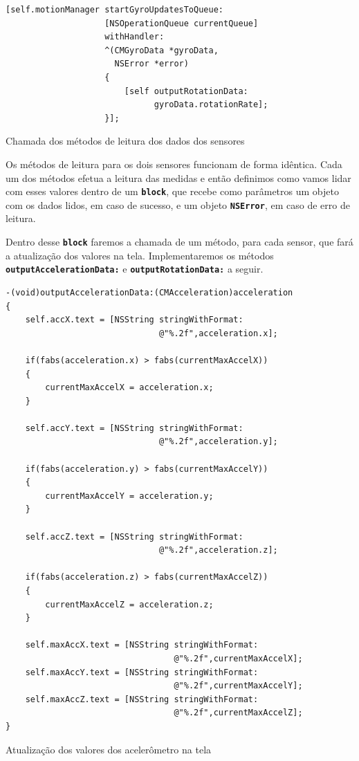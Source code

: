 \documentclass[a4paper,12pt,brazil,doubleside]{book}
\begin{document}
\begin{singlespace}
\begin{listing}[H]
\begin{verbatim}
[self.motionManager startGyroUpdatesToQueue:
                    [NSOperationQueue currentQueue]
                    withHandler:
                    ^(CMGyroData *gyroData,
                      NSError *error)
                    {
                    	[self outputRotationData:
                    	      gyroData.rotationRate];
                    }];
\end{verbatim}
\caption{Chamada dos métodos de leitura dos dados dos sensores}
\end{listing}


Os métodos de leitura para os dois sensores funcionam de forma idêntica. Cada um dos métodos efetua a leitura das medidas e então definimos como vamos lidar com esses valores dentro de um \texttt{\textbf{block}}, que recebe como parâmetros um objeto com os dados lidos, em caso de sucesso, e um objeto \texttt{\textbf{NSError}}, em caso de erro de leitura.

Dentro desse \texttt{\textbf{block}} faremos a chamada de um método, para cada sensor, que fará a atualização dos valores na tela. Implementaremos os métodos \texttt{\textbf{outputAccelerationData:}} e \texttt{\textbf{outputRotationData:}} a seguir.

\begin{listing}[H]
\begin{verbatim}
-(void)outputAccelerationData:(CMAcceleration)acceleration
{
    self.accX.text = [NSString stringWithFormat:
                               @"%.2f",acceleration.x];
    
    if(fabs(acceleration.x) > fabs(currentMaxAccelX))
    {
        currentMaxAccelX = acceleration.x;
    }
    
    self.accY.text = [NSString stringWithFormat:
                               @"%.2f",acceleration.y];
    
    if(fabs(acceleration.y) > fabs(currentMaxAccelY))
    {
        currentMaxAccelY = acceleration.y;
    }
    
    self.accZ.text = [NSString stringWithFormat:
                               @"%.2f",acceleration.z];
    
    if(fabs(acceleration.z) > fabs(currentMaxAccelZ))
    {
        currentMaxAccelZ = acceleration.z;
    }
    
    self.maxAccX.text = [NSString stringWithFormat:
                                  @"%.2f",currentMaxAccelX];
    self.maxAccY.text = [NSString stringWithFormat:
                                  @"%.2f",currentMaxAccelY];
    self.maxAccZ.text = [NSString stringWithFormat:
                                  @"%.2f",currentMaxAccelZ];
}
\end{verbatim}
\caption{Atualização dos valores dos acelerômetro na tela}
\end{listing}



\end{singlespace}
\end{document}
